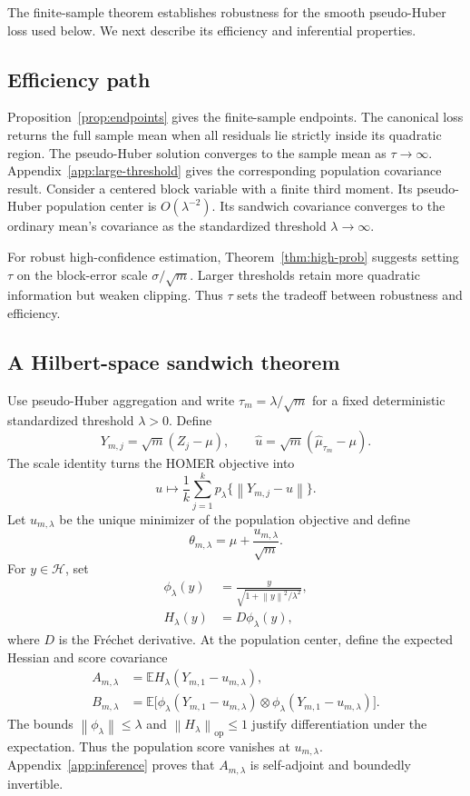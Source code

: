 \documentclass[twoside]{article}
\theoremstyle{definition}
\newcommand{\Hcal}{\mathcal H}
\newcommand{\E}{\mathbb E}
\newcommand{\norm}[1]{\left\lVert #1\right\rVert}
\newcommand{\op}{\mathrm{op}}
\begin{document}
The finite-sample theorem establishes robustness for the smooth pseudo-Huber loss used below. We next describe its efficiency and inferential properties.

\subsection{Efficiency path}

Proposition~\ref{prop:endpoints} gives the finite-sample endpoints. The canonical loss returns the full sample mean when all residuals lie strictly inside its quadratic region. The pseudo-Huber solution converges to the sample mean as $\tau\to\infty$. Appendix~\ref{app:large-threshold} gives the corresponding population covariance result. Consider a centered block variable with a finite third moment. Its pseudo-Huber population center is $O(\lambda^{-2})$. Its sandwich covariance converges to the ordinary mean's covariance as the standardized threshold $\lambda\to\infty$.

For robust high-confidence estimation, Theorem~\ref{thm:high-prob} suggests setting $\tau$ on the block-error scale $\sigma/\sqrt m$. Larger thresholds retain more quadratic information but weaken clipping. Thus $\tau$ sets the tradeoff between robustness and efficiency.




\subsection{A Hilbert-space sandwich theorem}

Use pseudo-Huber aggregation and write $\tau_m=\lambda/\sqrt m$ for a fixed deterministic standardized threshold $\lambda>0$. Define
\[
    Y_{m,j}=\sqrt m(Z_j-\mu),
    \qquad
    \hat u=\sqrt m(\hat\mu_{\tau_m}-\mu).
\]
The scale identity turns the HOMER objective into
\[
    u\mapsto \frac1k\sum_{j=1}^k
    p_\lambda\{\norm{Y_{m,j}-u}\}.
\]
Let $u_{m,\lambda}$ be the unique minimizer of the population objective and define
\begin{equation*}
    \theta_{m,\lambda}=\mu+\frac{u_{m,\lambda}}{\sqrt m}.
\end{equation*}
For $y\in\Hcal$, set
\begin{align*}
    \phi_\lambda(y)
    &=\frac{y}{\sqrt{1+\norm y^2/\lambda^2}},\\
    H_\lambda(y)
    &=D\phi_\lambda(y),
\end{align*}
where $D$ is the Fr\'echet derivative. At the population center, define the expected Hessian and score covariance
\begin{align*}
    A_{m,\lambda}
    &=\E H_\lambda(Y_{m,1}-u_{m,\lambda}),\\
    B_{m,\lambda}
    &=\E\big[\phi_\lambda(Y_{m,1}-u_{m,\lambda})
       \otimes\phi_\lambda(Y_{m,1}-u_{m,\lambda})\big].
\end{align*}
The bounds $\norm{\phi_\lambda}\le\lambda$ and $\norm{H_\lambda}_{\op}\le1$ justify differentiation under the expectation. Thus the population score vanishes at $u_{m,\lambda}$. Appendix~\ref{app:inference} proves that $A_{m,\lambda}$ is self-adjoint and boundedly invertible.
\end{document}
